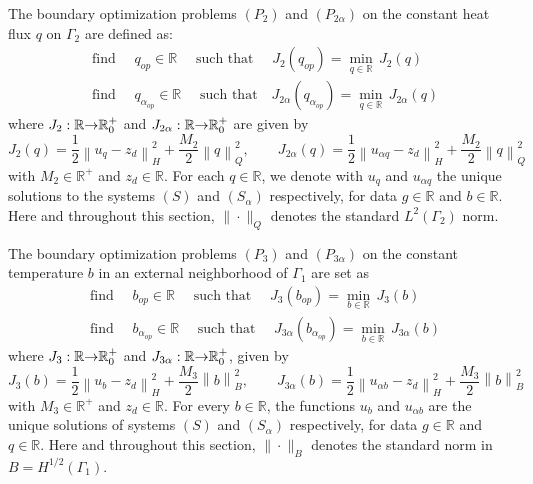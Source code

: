 \documentclass[11pt]{article}
\begin{document}
The boundary optimization problems $(P_2)$ and $(P_{2\alpha})$ on the constant heat flux $q$ on $\Gamma_{2}$ are defined as:
\begingroup
\addtolength{\jot}{0.5em}
\begin{align}
& \text{find }\quad q_{op}\in \mathbb{R}\quad\text{ such that }\quad
J_{2}(q_{op})=\min\limits_{q\in \mathbb{R}}\,J_{2}(q) \label{PControlJ2} \\
& \text{find }\quad q_{{\alpha}_{op}}\in \mathbb{R}\quad\text{ such that
}\quad J_{2\alpha}(q_{{\alpha}_{op}})=\min\limits_{q\in\mathbb{R}}\,J_{2\alpha}(q)  \label{PControlalfaJ2}
\end{align}
\endgroup
where 
$J_{2}:\mathbb{R}{\rightarrow}{\Bbb R}_{0}^{+}$ and
$J_{2\alpha}:\mathbb{R}{\rightarrow}{\Bbb R}_{0}^{+}$ are given by
\begin{equation}\label{J2-J2alpha}
J_{2}(q)=\frac{1}{2}\left\| u_{q}-z_{d}\right\|
_{H}^{2}+\frac{M_{2}}{2}\left\| q\right\|_{Q}^{2}, \qquad
J_{2\alpha}(q)=\frac{1}{2}\left\| u_{\alpha
q}-z_{d}\right\| _{H}^{2}+\frac{M_{2}}{2}\left\| q\right\|_{Q}^{2}
\end{equation}
with $M_2\in\mathbb{R}^+$ and $z_d\in
\mathbb{R}$. For each $q\in\mathbb{R}$,  we denote with $u_{q}$ and $u_{\alpha q}$  the unique solutions to the
systems $(S)$ and $(S_\alpha)$ respectively,  for data $g\in \mathbb{R}$ and $b\in \mathbb{R}$. 
{ Here and throughout this section, $\|\cdot\|_Q$ denotes the standard $L^2(\Gamma_2)$ norm.}

The boundary optimization problems $(P_3)$ and $(P_{3\alpha})$ on the constant temperature $b$ in an external neighborhood of $\Gamma_{1}$ are set as
\begingroup
\addtolength{\jot}{0.5em}
\begin{align}
& \text{find }\quad b_{op}\in \mathbb{R} \quad\text{ such
that }\quad J_{3}(b_{op})=\min\limits_{b\in
\mathbb{R}}\,J_{3}(b)
\label{PControlJ3} \\
& \text{find }\quad b_{{\alpha}_{op}}\in
\mathbb{R}\quad\text{ such that }\quad
J_{3\alpha}(b_{{\alpha}_{op}})=\min\limits_{b\in
\mathbb{R}}\,J_{3\alpha}({b})  \label{PControlalfaJ3}
\end{align}
\endgroup
where $J_{3}:\mathbb{R}{\rightarrow}{\Bbb R}_{0}^{+}$ and
$J_{3\alpha}:\mathbb{R}{\rightarrow}{\Bbb R}_{0}^{+}$, given by
\begin{equation}\label{J3-J3alpha}
J_{3}(b)=\frac{1}{2}\left\| u_{b}-z_{d}\right\|
_{H}^{2}+\frac{M_{3}}{2}\left\| b\right\|_{B}^{2},\qquad J_{3\alpha}(b)=\frac{1}{2}\left\| u_{\alpha b}-z_{d}\right\|
_{H}^{2}+\frac{M_{3}}{2}\left\| b\right\|_{B}^{2}
\end{equation}
\noindent with $M_3\in\mathbb{R}^+$ and $z_d\in \mathbb{R}$. For every $b\in\mathbb{R}$, the functions $u_{b}$ and $u_{\alpha b}$ are the unique solutions of  systems $(S)$ and $(S_\alpha)$ respectively, for data $g\in \mathbb{R}$ and $q\in\mathbb{R}$. 
{Here and throughout this section, $\|\cdot\|_B$ denotes the standard norm in $B=H^{1/2}(\Gamma_1)$.
}
\end{document}
